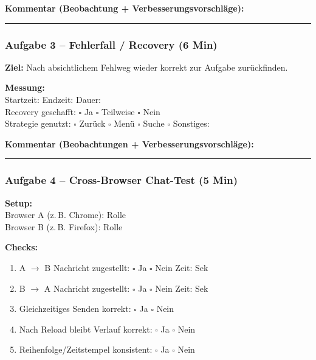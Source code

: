 \noindent\textbf{Kommentar (Beobachtung + Verbesserungsvorschläge):}

\vspace{2cm}
\noindent\rule{\textwidth}{0.4pt}

\subsubsection*{Aufgabe 3 – Fehlerfall / Recovery (6 Min)}

\noindent\textbf{Ziel:} Nach absichtlichem Fehlweg wieder korrekt zur Aufgabe zurückfinden.

\noindent\textbf{Messung:} \\
Startzeit: \underline{\hspace{2cm}} \quad
Endzeit: \underline{\hspace{2cm}} \quad
Dauer: \underline{\hspace{2cm}} \\
Recovery geschafft: $\square$ Ja \quad $\square$ Teilweise \quad $\square$ Nein \\
Strategie genutzt: $\square$ Zurück \quad $\square$ Menü \quad $\square$ Suche \quad
$\square$ Sonstiges: \underline{\hspace{2cm}}

\noindent\textbf{Kommentar (Beobachtungen + Verbesserungsvorschläge):}

\vspace{2cm}
\noindent\rule{\textwidth}{0.4pt}

\subsubsection*{Aufgabe 4 – Cross-Browser Chat-Test (5 Min)}

\noindent\textbf{Setup:} \\
Browser A (z.\,B. Chrome): Rolle \underline{\hspace{3cm}} \\
Browser B (z.\,B. Firefox): Rolle \underline{\hspace{3cm}}

\noindent\textbf{Checks:}
\begin{enumerate}
    \item A $\rightarrow$ B Nachricht zugestellt: $\square$ Ja \quad $\square$ Nein \quad Zeit: \underline{\hspace{1cm}} Sek
    \item B $\rightarrow$ A Nachricht zugestellt: $\square$ Ja \quad $\square$ Nein \quad Zeit: \underline{\hspace{1cm}} Sek
    \item Gleichzeitiges Senden korrekt: $\square$ Ja \quad $\square$ Nein
    \item Nach Reload bleibt Verlauf korrekt: $\square$ Ja \quad $\square$ Nein
    \item Reihenfolge/Zeitstempel konsistent: $\square$ Ja \quad $\square$ Nein
\end{enumerate}

